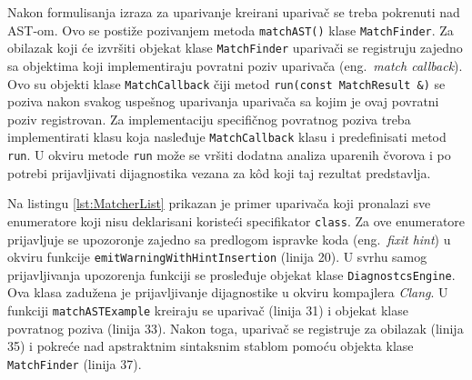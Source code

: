 \documentclass[12pt,oneside]{memoir}
\begin{document}
\par
Nakon formulisanja izraza za uparivanje kreirani upariva\v{c} se treba pokrenuti nad AST-om. Ovo se posti\v{z}e pozivanjem metoda \texttt{matchAST()} klase \texttt{MatchFinder}. 
Za obilazak koji \'{c}e izvr\v{s}iti objekat klase \texttt{MatchFinder} upariva\v{c}i se registruju zajedno sa objektima koji implementiraju povratni poziv upariva\v{c}a (eng.~\textit{match callback}). 
Ovo su objekti klase \texttt{MatchCallback} \v{c}iji metod \texttt{run(const MatchResult \&)} se poziva nakon svakog uspe\v{s}nog uparivanja 
upariva\v{c}a sa kojim je ovaj povratni poziv registrovan. Za implementaciju specifi\v{c}nog povratnog poziva treba implementirati klasu koja nasleđuje \texttt{MatchCallback} klasu i predefinisati metod \texttt{run}. U okviru metode \texttt{run} mo\v{z}e se vr\v{s}iti dodatna analiza uparenih \v{c}vorova i po potrebi
prijavljivati dijagnostika vezana za k\^{o}d koji taj rezultat predstavlja. \par
Na listingu \ref{lst:MatcherList} prikazan je primer upariva\v{c}a koji pronalazi sve enumeratore koji nisu deklarisani koriste\'{c}i specifikator \texttt{class}. Za ove enumeratore prijavljuje se upozoronje zajedno sa predlogom ispravke koda (eng.~\textit{fixit hint}) u okviru funkcije \texttt{emitWarningWithHintInsertion} (linija 20). U svrhu samog
prijavljivanja upozorenja funkciji se prosleđuje objekat klase \texttt{DiagnostcsEngine}. Ova klasa zadu\v{z}ena je prijavljivanje dijagnostike u okviru kompajlera \textit{Clang}. U funkciji \texttt{matchASTExample} kreiraju se upariva\v{c} (linija 31) i objekat klase povratnog poziva (linija 33). Nakon toga, upariva\v{c} se registruje za obilazak (linija 35) i pokre\'{c}e nad apstraktnim sintaksnim stablom pomo\'{c}u objekta klase \texttt{MatchFinder} (linija 37).
\end{document}
